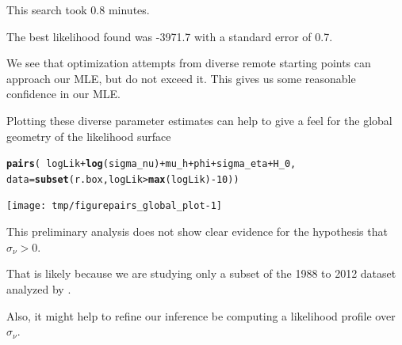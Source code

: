 \documentclass{beamer}\usepackage[]{graphicx}\usepackage[]{color}
\makeatletter
\newcommand{\hlnum}[1]{\textcolor[rgb]{0.686,0.059,0.569}{#1}}%
\newcommand{\hlopt}[1]{\textcolor[rgb]{0,0,0}{#1}}%
\newcommand{\hlstd}[1]{\textcolor[rgb]{0.345,0.345,0.345}{#1}}%
\newcommand{\hlkwc}[1]{\textcolor[rgb]{0.333,0.667,0.333}{#1}}%
\newcommand{\hlkwd}[1]{\textcolor[rgb]{0.737,0.353,0.396}{\textbf{#1}}}%
\newenvironment{kframe}{%
 \def\at@end@of@kframe{}%
 \ifinner\ifhmode%
  \def\at@end@of@kframe{\end{minipage}}%
  \begin{minipage}{\columnwidth}%
 \fi\fi%
 \def\FrameCommand##1{\hskip\@totalleftmargin \hskip-\fboxsep
 \colorbox{shadecolor}{##1}\hskip-\fboxsep
     \hskip-\linewidth \hskip-\@totalleftmargin \hskip\columnwidth}%
 \MakeFramed {\advance\hsize-\width
   \@totalleftmargin\z@ \linewidth\hsize
   \@setminipage}}%
 {\par\unskip\endMakeFramed%
 \at@end@of@kframe}
\newenvironment{knitrout}{}{} %
\makeatother
\begin{document}
\begin{frame}[fragile]

\bi

\item This search took  0.8 minutes. 

\item The best likelihood found was -3971.7 with a standard error of 0.7. 

\item We see that optimization attempts from diverse remote starting points can approach our MLE, but do not exceed it. This gives us some reasonable confidence in our MLE. 

\item Plotting these diverse parameter estimates can help to give a feel for the global geometry of the likelihood surface 

\ei

\end{frame}

\begin{frame}[fragile]

\begin{knitrout}\small
{}\color{fgcolor}\begin{kframe}
\begin{alltt}
\hlkwd{pairs}\hlstd{(}\hlopt{~}\hlstd{logLik}\hlopt{+}\hlkwd{log}\hlstd{(sigma_nu)}\hlopt{+}\hlstd{mu_h}\hlopt{+}\hlstd{phi}\hlopt{+}\hlstd{sigma_eta}\hlopt{+}\hlstd{H_0,}
  \hlkwc{data}\hlstd{=}\hlkwd{subset}\hlstd{(r.box,logLik}\hlopt{>}\hlkwd{max}\hlstd{(logLik)}\hlopt{-}\hlnum{10}\hlstd{))}
\end{alltt}
\end{kframe}
\end{knitrout}

\vspace{-4mm}

\begin{knitrout}\small
{}\color{fgcolor}

{\centering \texttt{[image: tmp/figurepairs\_global\_plot-1]} 

}



\end{knitrout}
\end{frame}

\begin{frame}[fragile]

\bi

\item This preliminary analysis does not show clear evidence for the hypothesis that $\sigma_\nu > 0$. 

\item That is likely because we are studying only a subset of the 1988 to 2012 dataset analyzed by \citet{breto14}. 

\item Also, it might help to refine our inference be computing a likelihood profile over $\sigma_\nu$.

\ei

\end{frame}
\end{document}
